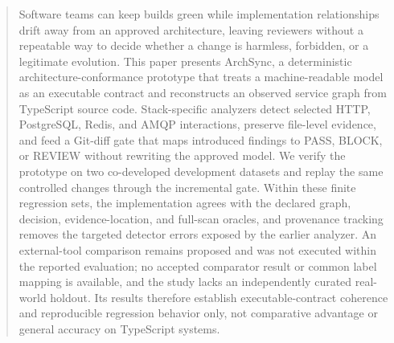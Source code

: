 \begin{abstract}
Software teams can keep builds green while implementation relationships drift away from an approved architecture, leaving reviewers without a repeatable way to decide whether a change is harmless, forbidden, or a legitimate evolution. This paper presents ArchSync, a deterministic architecture-conformance prototype that treats a machine-readable model as an executable contract and reconstructs an observed service graph from TypeScript source code. Stack-specific analyzers detect selected HTTP, PostgreSQL, Redis, and AMQP interactions, preserve file-level evidence, and feed a Git-diff gate that maps introduced findings to PASS, BLOCK, or REVIEW without rewriting the approved model. We verify the prototype on two co-developed development datasets and replay the same controlled changes through the incremental gate. Within these finite regression sets, the implementation agrees with the declared graph, decision, evidence-location, and full-scan oracles, and provenance tracking removes the targeted detector errors exposed by the earlier analyzer. An external-tool comparison remains proposed and was not executed within the reported evaluation; no accepted comparator result or common label mapping is available, and the study lacks an independently curated real-world holdout. Its results therefore establish executable-contract coherence and reproducible regression behavior only, not comparative advantage or general accuracy on TypeScript systems.
\end{abstract}
